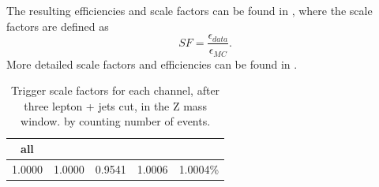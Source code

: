 The resulting efficiencies and scale factors can be found in  , where the scale factors are defined as 
\begin{equation}
SF = \frac{\epsilon_{data}}{\epsilon_{MC}}.
\end{equation} 
More detailed scale factors and efficiencies can be found in .
\begin{table}[htbp]
	\centering
	\caption{Trigger scale factors for each channel, after three lepton + jets cut, in the Z mass window. by counting number of events.}
	\begin{tabular}{ccccc}
		\toprule 
		all & \mumumu & \eee & \eemu & \emumu \\ 
		\midrule 
		1.0000 & 1.0000 & 0.9541 & 1.0006  & 1.0004\% \\ 
		\bottomrule
	\end{tabular} 
	\label{tab:trigSFe}
\end{table}

